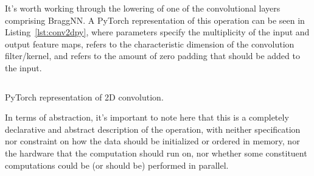 It's worth working through the lowering of one of the convolutional layers comprising BraggNN.
A PyTorch representation of this operation can be seen in Listing~\ref{lst:conv2dpy}, where  parameters specify the multiplicity of the input and output feature maps,  refers to the characteristic dimension of the convolution filter/kernel, and  refers to the amount of zero padding that should be added to the input.
\begin{longlisting}
	\inputminted{python}{sources/conv2d.py}
	\caption{PyTorch representation of 2D convolution.}
	\label{lst:conv2dpy}
\end{longlisting}
In terms of abstraction, it's important to note here that this is a completely declarative and abstract description of the operation, with neither specification nor constraint on how the data should be initialized or ordered in memory, nor the hardware that the computation should run on, nor whether some constituent computations could be (or should be) performed in parallel.

